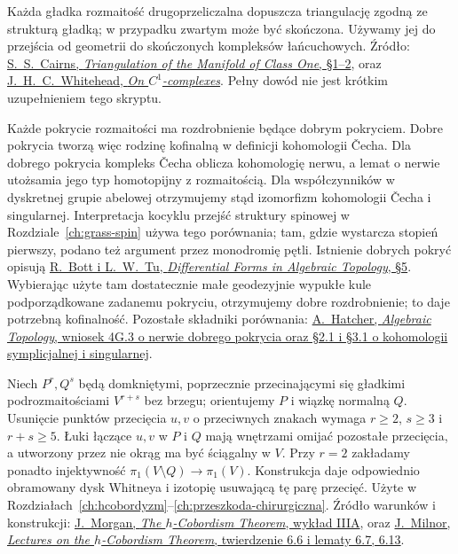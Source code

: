 \begin{description}[leftmargin=2.9cm,style=nextline]
\item[Triangulacja gładka.]
  Każda gładka rozmaitość
  drugoprzeliczalna dopuszcza
  triangulację zgodną ze
  strukturą gładką; w przypadku
  zwartym może być skończona.
  Używamy jej do przejścia od
  geometrii do skończonych
  kompleksów łańcuchowych.
  Źródło:
  \href{https://www.ams.org/bull/1935-41-08/S0002-9904-1935-06140-3/S0002-9904-1935-06140-3.pdf}
  {S.~S.\ Cairns, \emph{Triangulation of the
  Manifold of Class One}, §1--2}, oraz
  \href{https://doi.org/10.2307/1968861}
  {J.~H.~C.\ Whitehead, \emph{On $C^1$-complexes}}.
  Pełny dowód nie jest krótkim
  uzupełnieniem tego skryptu.

\item[Kohomologia Čech i singularna.]
  Każde pokrycie rozmaitości ma
  rozdrobnienie będące dobrym pokryciem.
  Dobre pokrycia tworzą więc rodzinę
  kofinalną w definicji kohomologii
  Čecha. Dla dobrego pokrycia kompleks
  Čecha oblicza kohomologię nerwu,
  a lemat o nerwie utożsamia jego
  typ homotopijny z rozmaitością.
  Dla współczynników w dyskretnej
  grupie abelowej otrzymujemy stąd
  izomorfizm kohomologii Čecha
  i singularnej. Interpretacja
  kocyklu przejść struktury
  spinowej w Rozdziale~\ref{ch:grass-spin}
  używa tego porównania;
  tam, gdzie wystarcza stopień
  pierwszy, podano też argument
  przez monodromię pętli.
  Istnienie dobrych pokryć opisują
  \href{https://doi.org/10.1007/978-1-4757-3951-0}
  {R.\ Bott i L.~W.\ Tu, \emph{Differential Forms in
  Algebraic Topology}, §5}. Wybierając użyte tam dostatecznie
  małe geodezyjnie wypukłe kule podporządkowane zadanemu pokryciu,
  otrzymujemy dobre rozdrobnienie; to daje potrzebną kofinalność.
  Pozostałe składniki porównania:
  \href{https://pi.math.cornell.edu/~hatcher/AT/AT.pdf}
  {A.\ Hatcher, \emph{Algebraic Topology},
  wniosek 4G.3 o nerwie dobrego pokrycia
  oraz §2.1 i §3.1 o kohomologii
  symplicjalnej i singularnej}.

\item[Trik Whitneya i ruchy uchwytów.]
  Niech $P^r,Q^s$ będą domkniętymi, poprzecznie
  przecinającymi się gładkimi podrozmaitościami
  $V^{r+s}$ bez brzegu; orientujemy $P$ i wiązkę
  normalną $Q$. Usunięcie punktów przecięcia $u,v$
  o przeciwnych znakach wymaga $r\geq2$, $s\geq3$
  i $r+s\geq5$. Łuki łączące $u,v$ w $P$ i $Q$
  mają wnętrzami omijać pozostałe przecięcia, a utworzony
  przez nie okrąg ma być ściągalny w $V$. Przy $r=2$
  zakładamy ponadto injektywność
  $\pi_1(V\setminus Q)\to\pi_1(V)$. Konstrukcja daje
  odpowiednio obramowany dysk Whitneya i izotopię
  usuwającą tę parę przecięć.
  Użyte w
  Rozdziałach~\ref{ch:hcobordyzm}--\ref{ch:przeszkoda-chirurgiczna}.
  Źródło warunków i konstrukcji:
  \href{https://www.math.columbia.edu/~jmorgan/Lecture_IIIA_hcobordism_Contd.pdf}
  {J.\ Morgan, \emph{The $h$-Cobordism Theorem},
  wykład IIIA}, oraz
  \href{https://webhomes.maths.ed.ac.uk/~v1ranick/surgery/hcobord.pdf}
  {J.\ Milnor, \emph{Lectures on the $h$-Cobordism Theorem},
  twierdzenie 6.6 i lematy 6.7, 6.13}.


\end{description}
